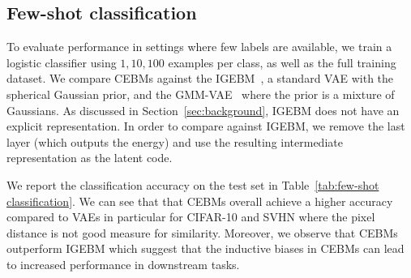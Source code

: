 \documentclass{article}
\begin{document}
\vspace*{-1.0ex}
\subsection{Few-shot classification}\label{sec:exp:fewshots}
\vspace*{-1.0ex}


To evaluate performance in settings where few labels are available, we train a logistic classifier using $1, 10, 100$ examples per class, as well as the full training dataset. We compare CEBMs against the  IGEBM~\cite{du2019implicit}, a standard VAE  with the spherical Gaussian prior, and the GMM-VAE~\cite{tomczak2018vae} where the prior is a mixture of Gaussians. As discussed in Section~\ref{sec:background}, IGEBM does not have an explicit representation. In order to compare against IGEBM, we remove the last layer (which outputs the energy) and use the resulting intermediate representation as the latent code. 

We report the classification accuracy on the test set in Table~\ref{tab:few-shot classification}. We can see that that CEBMs overall achieve a higher accuracy compared to VAEs in particular for CIFAR-10 and SVHN where the pixel distance is not good measure for similarity. Moreover, we observe that CEBMs outperform IGEBM which suggest that the inductive biases in CEBMs can lead to increased performance in downstream tasks. 
\end{document}
